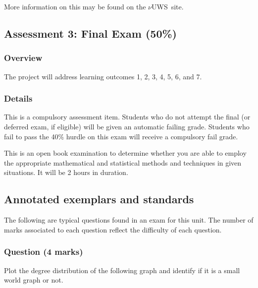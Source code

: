 \documentclass{uws_learning_guide}
\newcommand{\vuws}{$\nu$UWS}
\begin{document}
More information on this may be found on the \vuws~site.


\subsection{Assessment 3: Final Exam (50\%)}

\subsubsection{Overview}

The project will address learning outcomes 1, 2, 3, 4, 5, 6, and 7.

\subsubsection{Details}

This is a compulsory assessment item. Students who do not attempt the
final (or deferred exam, if eligible) will be given an automatic
failing grade.  Students who fail to pass the 40\% hurdle on this exam
will receive a compulsory fail grade.

This is an open book examination to determine whether you are able to
employ the appropriate mathematical and statistical methods and
techniques in given situations. It will be 2 hours in duration.




\subsection{\hintlogo{} Annotated exemplars and standards}

The following are typical questions found in an exam for this
unit. The number of marks associated to each question reflect the
difficulty of each question.


\subsubsection*{Question (4 marks)}

Plot the degree distribution of the following graph and identify if it
is a small world graph or not.
\end{document}
